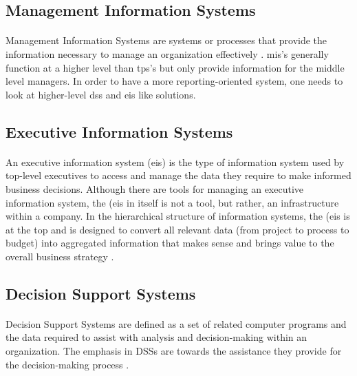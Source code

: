 \subsection{Management Information Systems}

\paragraph{} Management Information Systems are systems or processes that provide the information necessary to manage an organization effectively \cite{Comptroller1995, TexasAMUni2012}. \acrshort{mis}'s generally function at a higher level than \acrshort{tps}'s but only provide information for the middle level managers. In order to have a more reporting-oriented system, one needs to look at higher-level \acrshort{dss} and \acrshort{eis} like solutions.

\subsection{Executive Information Systems}

\paragraph{} An executive information system (\acrshort{eis}) is the type of information system used by top-level executives to access and manage the data they require to make informed business decisions. Although there are tools for managing an executive information system, the (\acrshort{eis} in itself is not a tool, but rather, an infrastructure within a company. In the hierarchical structure of information systems, the (\acrshort{eis} is at the top and is designed to convert all relevant data (from project to process to budget) into aggregated information that makes sense and brings value to the overall business strategy \cite{AtTask2013}.

\subsection{Decision Support Systems}
\label{section-DSSIntro}

\paragraph{} Decision Support Systems are defined as a set of related computer programs and the data required to assist with analysis and decision-making within an organization. The emphasis in DSSs are towards the assistance they provide for the decision-making process \cite{Turban2005}.

